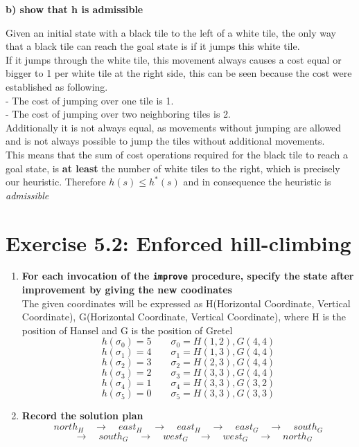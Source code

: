 \documentclass[12pt,a4paper]{article}
\begin{document}
	\textbf{b) show that h is admissible}
	\begin{addmargin}[1em]{1em}%
		\quad Given an initial state with a black tile to the left of a white
		tile, the only way that a black tile can reach the goal state is if
		it jumps this white tile. \\
		If it jumps through the white tile, this movement always causes a cost equal or bigger to 1 per white tile at the right side, this can be seen because the cost were established as following.\\
		- The cost of jumping over one tile is 1.\\
		- The cost of jumping over two neighboring tiles is 2. \\
		Additionally it is not always equal, as movements without jumping are allowed and is not always possible to jump the tiles without additional movements.\\
		This means that the sum of cost operations required for the black tile to reach a goal state,
		is \textbf{at least} the number of white tiles to the right, which is 
		precisely our heuristic. Therefore $h(s) \leq h^*(s) $
		and in consequence the heuristic is \emph{admissible}
	\end{addmargin}

\section*{Exercise 5.2: Enforced hill-climbing}
\begin{enumerate}[label=\alph*)]
	\item \textbf{For each invocation of the 
			\texttt{improve} procedure, specify
			the state after improvement by giving the new coodinates}\\
	The given coordinates will be expressed as H(Horizontal Coordinate, Vertical Coordinate), G(Horizontal Coordinate, Vertical Coordinate), where H is the position of Hansel and G is the position of Gretel\\
	\[h(\sigma_0) = 5 \qquad \sigma_0 = H(1,2), G(4,4) \]
	\[h(\sigma_1) = 4 \qquad \sigma_1 = H(1,3), G(4,4) \]
	\[h(\sigma_2) = 3 \qquad \sigma_2 = H(2,3), G(4,4) \]	\[h(\sigma_3) = 2 \qquad \sigma_3 = H(3,3), G(4,4) \]	\[h(\sigma_4) = 1 \qquad \sigma_4 = H(3,3), G(3,2) \]	\[h(\sigma_5) = 0 \qquad \sigma_5 = H(3,3), G(3,3) \]	
	\item \textbf{Record the solution plan}
	\[north_H \quad \rightarrow \quad east_H \quad \rightarrow \quad east_H \quad \rightarrow \quad east_G
	\quad \rightarrow \quad south_G \]
	\[\quad \rightarrow \quad south_G \quad \rightarrow \quad west_G \quad \rightarrow \quad west_G \quad \rightarrow \quad north_G\]
\end{enumerate}
\end{document}
